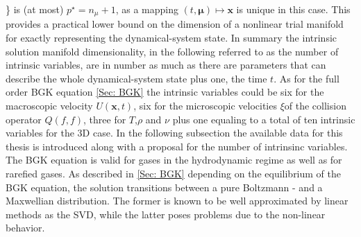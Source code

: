 \mu \in {}\}\) is (at most) \(p^{\star} = n_{\mu} + 1\), as a mapping \((t,\mathbf{\mu})\mapsto \mathbf{x}\) is unique in this case. This provides a practical lower bound on the dimension of a nonlinear trial manifold for exactly representing the dynamical-system state. In summary the intrinsic solution manifold dimensionality, in the following referred to as the number of intrinsic variables, are in number as much as there are parameters that can describe the whole dynamical-system state plus one, the time \(t\). As for the full order BGK equation \cref{Sec: BGK} the intrinsic variables could be six for the macroscopic velocity \(U(\mathbf{x},t)\), six for the microscopic velocities \(\xi\)of the collision operator \(Q(f,f)\), three for \(T\),\(\rho\) and \(\nu\) plus one equaling to a total of ten intrinsic variables for the 3D case. In the following subsection the available data for this thesis is introduced along with a proposal for the number of intrinsinc variables.\\
The BGK equation is valid for gases in the hydrodynamic regime as well as for rarefied gases. As described in \cref{Sec: BGK} depending on the equilibrium of the BGK equation, the solution transitions between a pure Boltzmann - and a Maxwellian distribution. The former is known to be well approximated by linear methods as the SVD, while the latter poses problems due to the non-linear behavior. 
